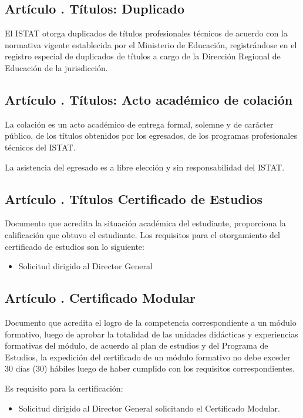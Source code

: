\subsection{Artículo . Títulos: Duplicado}
\addtocounter{ns}{1}
El ISTAT otorga duplicados de títulos profesionales técnicos de acuerdo con la normativa vigente establecida por el Ministerio de Educación, registrándose en el registro especial de duplicados de títulos a cargo de la Dirección Regional de Educación de la jurisdicción. 
\subsection{Artículo . Títulos: Acto académico de colación}
\addtocounter{ns}{1}
La colación es un acto académico de entrega formal, solemne y de carácter público, de los títulos obtenidos por los egresados, de los programas profesionales técnicos del ISTAT. 

La asistencia del egresado es a libre elección y sin responsabilidad del ISTAT. 
\subsection{Artículo . Títulos Certificado de Estudios}
\addtocounter{ns}{1}
Documento que acredita la situación académica del estudiante, proporciona la calificación que obtuvo el estudiante. 
Los requisitos para el otorgamiento del certificado de estudios son lo siguiente: 
\begin{itemize}
\item Solicitud dirigido al Director General  
\end{itemize}
\subsection{Artículo . Certificado Modular}
\addtocounter{ns}{1}
Documento que acredita el logro de la competencia correspondiente a un módulo formativo, luego de aprobar la totalidad de las unidades didácticas y experiencias formativas del módulo, de acuerdo al plan de estudios y del Programa de Estudios, la expedición del certificado de un módulo formativo no debe exceder 30 días (30) hábiles luego de haber cumplido con los requisitos correspondientes. 

Es requisito para la certificación: 
\begin{itemize}
\item Solicitud dirigido al Director General solicitando el Certificado Modular. 
\end{itemize}
